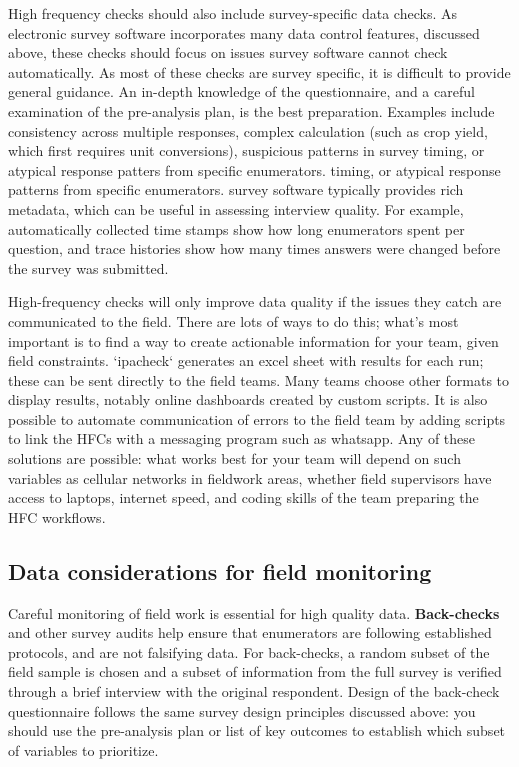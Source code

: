 High frequency checks should also include survey-specific data checks. As electronic survey 
software incorporates many data control features, discussed above, these checks 
should focus on issues survey software cannot check automatically. As most of 
these checks are survey specific, it is difficult to provide general guidance. 
An in-depth knowledge of the questionnaire, and a careful examination of the 
pre-analysis plan, is the best preparation. Examples include  consistency 
across multiple responses, complex calculation (such as crop yield, which first requires unit conversions), 
suspicious patterns in survey timing, or atypical response patters from specific enumerators. 
timing, or atypical response patterns from specific enumerators.
survey software typically provides rich metadata, which can be useful in 
assessing interview quality. For example, automatically collected time stamps 
show how long enumerators spent per question, and trace histories show how many 
times answers were changed before the survey was submitted.

High-frequency checks will only improve data quality if the issues they catch are communicated to the field.
There are lots of ways to do this; what's most important is to find a way to create actionable information for your team, given field constraints.
`ipacheck` generates an excel sheet with results for each run; these can be sent directly to the field teams.
Many teams choose other formats to display results, notably online dashboards created by custom scripts.
It is also possible to automate communication of errors to the field team by adding scripts to link the HFCs with a messaging program such as whatsapp.
Any of these solutions are possible: what works best for your team will depend on such variables as cellular networks in fieldwork areas, whether field supervisors have access to laptops, internet speed, and coding skills of the team preparing the HFC workflows.


\subsection{Data considerations for field monitoring}
Careful monitoring of field work is essential for high quality data.
\textbf{Back-checks} and
other survey audits help ensure that enumerators are following established protocols, and are not falsifying data.
For back-checks, a random subset of the field sample is chosen and a subset of information from the full survey is
verified through a brief interview with the original respondent.
Design of the back-check questionnaire follows the same survey design
principles discussed above: you should use the pre-analysis plan
or list of key outcomes to establish which subset of variables to prioritize.

